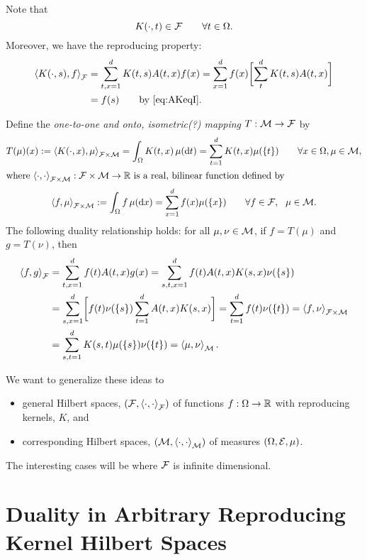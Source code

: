 \documentclass[reqno]{amsart}
\begin{document}
Note that 
\[
K(\cdot,t) \in \cf \qquad \forall t \in \Omega.
\]
Moreover, we have the reproducing property:
\begin{align*}
\ip[\cf]{K(\cdot,s)}{f} &=  \sum_{t,x=1}^d K(t,s) A(t,x) f(x) 
= \sum_{x=1}^d f(x) \biggl[\sum_{t}^d K(t,s) A(t,x) \biggr] \\
& = f(s) \qquad \text{by \eqref{eq:AKeqI}}.
\end{align*}


Define the \emph{one-to-one and onto, isometric(?) mapping} $T : \cm \to \cf$ by 
\begin{gather*}
    T(\mu)(x) := \ip[\cf \times \cm]{K(\cdot, x)}{\mu} = \int_\Omega K(t, x) \, \mu(\dif t) = \sum_{t=1}^d K(t,x) \mu(\{t\}) \qquad \forall x \in \Omega, \mu \in \cm, \\
    \intertext{where $ \ip[\cf \times \cm]{\cdot}{\cdot} : \cf \times \cm \to \reals$ is a real, bilinear function defined by} 
    \ip[\cf \times \cm]{f}{\mu} := \int_\Omega f \, \mu(\dif x) = \sum_{x=1}^d f(x) \mu(\{x\}) \qquad \forall f \in \cf, \ \  \mu \in \cm.
\end{gather*}
The following duality relationship holds:  for all $\mu, \nu \in \cm$, if $f = T(\mu)$ and $g = T (\nu)$, then 
\begin{align*}
    \ip[\cf]{f}{g} 
    & = \sum_{t,x=1}^d f(t) A(t,x) g(x)
    = \sum_{s,t,x=1}^d f(t) A(t,x)  K(s,x) \nu(\{s\})  \\
    &
    = \sum_{s,x=1}^d \biggl [ f(t) \nu(\{s\}) \sum_{t=1}^d A(t,x)  K(s,x) \biggr]
    = \sum_{t=1}^d f(t) \nu(\{t\}) = \ip[\cf \times \cm]{f}{\nu} \\
    & = \sum_{s,t=1}^d K(s,t) \mu(\{s\}) \nu(\{t\}) =  \ip[\cm]{\mu}{\nu} .
\end{align*}

We want to generalize these ideas to 
\begin{itemize}
    \item general Hilbert spaces, $(\cf, \ip[\cf]{\cdot}{\cdot})$  of functions $f : \Omega \to \reals$ with reproducing kernels, $K$, and 
    \item corresponding Hilbert spaces, $(\cm, \ip[\cm]{\cdot}{\cdot})$  of measures $(\Omega, \ce, \mu)$.
\end{itemize}
The interesting cases will be where $\cf$ is infinite dimensional.



\section{Duality in Arbitrary Reproducing Kernel Hilbert Spaces}
\end{document}
